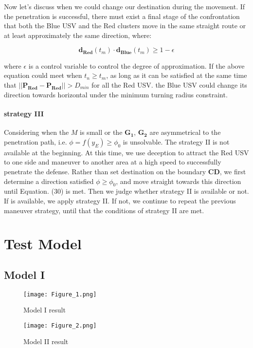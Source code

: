 \documentclass{mcmthesis}
\begin{document}
Now let's discuss when we could change our destination during the movement. If the penetration is successful, there must exist a final stage of the confrontation that both the Blue USV and the Red clusters move in the same straight route or at least approximately the same direction, where:

\begin{equation}
\mathbf{d_{Red}}(t_m) \cdot \mathbf{d_{Blue}}(t_m) \geq 1 - \epsilon
\end{equation}

where $\epsilon$ is a control variable to control the degree of approximation. If the above equation could meet when $t_n \geq t_m$, as long as it can be satisfied at the same time that $\vert \vert \mathbf{P_{Red}} - \mathbf{P_{Red}} \vert \vert > D_{min}$ for all the Red USV. the Blue USV could change its direction towards horizontal under the minimum turning radius constraint.

\paragraph{strategy III}

Considering when the $M$ is small or the $\mathbf{G_1}$, $\mathbf{G_2}$ are asymmetrical to the penetration path, i.e. $\phi = f(y_E) \geq \phi_0$ is unsolvable. The strategy II is not available at the beginning. At this time, we use deception to attract the Red USV to one side and maneuver to another area at a high speed to successfully penetrate the defense. Rather than set destination on the boundary $\mathbf{CD}$, we first determine a direction satisfied $\phi \geq \phi_0$, and move straight towards this direction until Equation. (30) is met. Then we judge whether strategy II is available or not. If is available, we apply strategy II. If not, we continue to repeat the previous maneuver strategy, until that the conditions of strategy II are met.

\section{Test Model}
\subsection{Model I}
\begin{figure}[h]
\centering
\texttt{[image: Figure\_1.png]}
\caption{Model I result} \label{fig:Model I result}
\end{figure}
\begin{figure}[h]
\centering
\texttt{[image: Figure\_2.png]}
\caption{Model II result} \label{fig:Model II result}
\end{figure}
\end{document}
